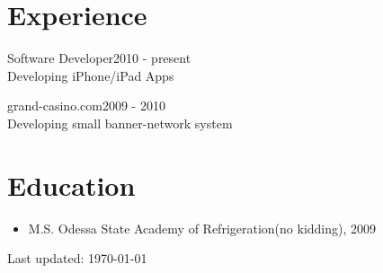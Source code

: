 \documentclass[letterpaper]{article}
\begin{document}
\section*{Experience}

\begin{description}
  \item{Software Developer}\hfill 2010 - present\\
    Developing iPhone/iPad Apps

  \item{grand-casino.com}\hfil 2009 - 2010\\
    Developing small banner-network system
\end{description}

\section*{Education}

\begin{itemize}
  \item M.S. Odessa State Academy of Refrigeration(no kidding), 2009
\end{itemize}
    

\begin{center}
  \begin{footnotesize}
    Last updated: \today \\
  \end{footnotesize}
\end{center}
\end{document}
